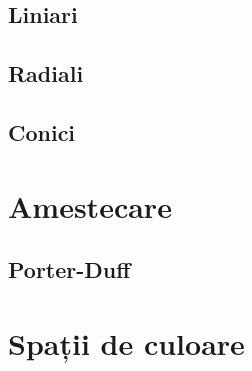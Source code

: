 \documentclass[a4paper, 12pt]{report}
\begin{document}
\subsection{Liniari}
\subsection{Radiali}
\subsection{Conici}

\section{Amestecare}
\subsection{Porter-Duff}

\section{Spații de culoare}

\printbibliography
\end{document}
